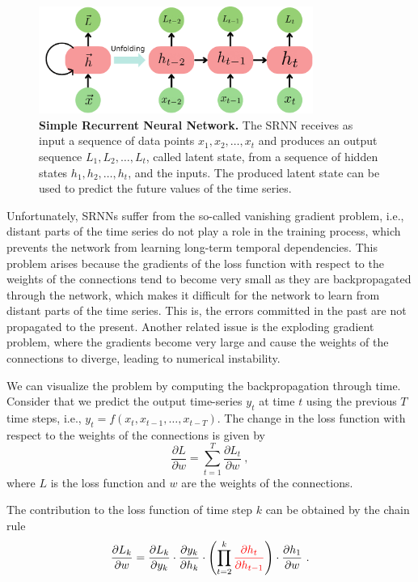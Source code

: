 \begin{figure}[H]
  \centering
  \includegraphics[width=0.8\textwidth]{Figures/RNN.pdf}
  \caption[Simple Recurrent Neural Network]{
    \textbf{Simple Recurrent Neural Network.} The SRNN receives as input a
    sequence of data points $x_1, x_2, \ldots, x_t$ and produces an output
    sequence $L_1, L_2, \ldots, L_t$, called latent state, from a sequence of
    hidden states $h_1, h_2, \ldots, h_t$, and the inputs. The produced
    latent
    state can be used to predict the future values of the time series.}
  \label{fig:SRNN_scheme}
\end{figure}

Unfortunately, SRNNs suffer from the so-called vanishing gradient problem,
i.e.,
distant parts of the time series do not play a role in the training process,
which prevents the network from learning long-term temporal dependencies.
This
problem arises because the gradients of the loss function with respect to the
weights of the connections tend to become very small as they are
backpropagated
through the network, which makes it difficult for the network to learn from
distant parts of the time series. This is, the errors committed in the past
are
not propagated to the present. Another related issue is the exploding
gradient
problem, where the gradients become very large and cause the weights of the
connections to diverge, leading to numerical instability.

We can visualize the problem by computing the backpropagation through time.
Consider that we predict the output time-series $y_t$ at time $t$ using the
previous $T$ time steps, i.e., $y_t = f(x_t, x_{t-1}, \ldots, x_{t-T})$. The
change in the loss function with respect to the weights of the connections is
given by
\begin{equation}\label{eq:loss_RNN}
  \frac{\partial L}{\partial w} = \sum_{t=1}^{T} \frac{\partial L_t}{\partial
    w} \ ,
\end{equation}
where $L$ is the loss function and $w$ are the weights of the connections.

The contribution to the loss function of time step $k$ can be obtained by the
chain rule
\begin{equation}
  \frac{\partial L_k}{\partial w} = \frac{\partial L_k}{\partial
    y_k}\cdot\frac{\partial y_k}{\partial
    h_k}\cdot\left(\prod_{t=2}^k\textcolor{red}{\frac{\partial
      h_t}{\partial h_{t-1}}}\right)\cdot\frac{\partial h_1}{\partial w} \ .
\end{equation}


